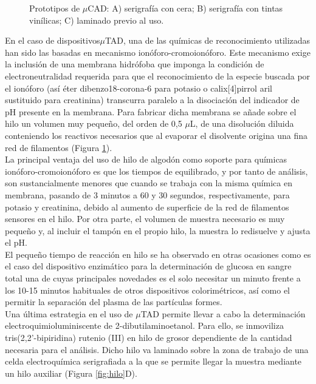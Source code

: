 \documentclass{article}
\begin{document}
\begin{figure}[h]
	\caption{Prototipos de $\mu$CAD: A) serigrafía con cera; B) serigrafía con tintas vinílicas; C) laminado previo al uso.}
	\label{fig:micro}
\end{figure}

En el caso de dispositivos$\mu$TAD, una de las químicas de reconocimiento utilizadas han sido las basadas en mecanismo ionóforo-cromoionóforo. Este mecanismo exige la inclusión de una membrana hidrófoba que imponga la condición de electroneutralidad requerida para que el reconocimiento de la especie buscada por el ionóforo (así éter dibenzo18-corona-6 para potasio\cite{Erenas2016} o calix[4]pirrol aril sustituido para creatinina) transcurra paralelo a la disociación del indicador de pH presente en la membrana. Para fabricar dicha membrana se añade sobre el hilo un volumen muy pequeño, del orden de 0,5 $\mu$L, de una disolución diluida conteniendo los reactivos necesarios que al evaporar el disolvente origina una fina red de filamentos (Figura \ref{fig:micro}).\\

La principal ventaja del uso de hilo de algodón como soporte para químicas ionóforo-cromoionóforo es que los tiempos de equilibrado, y por tanto de análisis, son sustancialmente menores que cuando se trabaja con la misma química en membrana, pasando de 3 minutos a 60 y 30 segundos, respectivamente, para potasio y creatinina, debido al aumento de superficie de la red de filamentos sensores en el hilo. Por otra parte, el volumen de muestra necesario es muy pequeño y, al incluir el tampón en el propio hilo, la muestra lo redisuelve y ajusta el pH. \\

El pequeño tiempo de reacción en hilo se ha observado en otras ocasiones como es el caso del dispositivo enzimático para la determinación de glucosa en sangre total una de cuyas principales novedades es el solo necesitar un minuto frente a los 10-15 minutos habituales de otros dispositivos colorimétricos, así como el permitir la separación del plasma de las partículas formes.\\

Una última estrategia en el uso de $\mu$TAD permite llevar a cabo la determinación electroquimioluminiscente de 2-dibutilaminoetanol. Para ello, se inmoviliza tris(2,2'-bipiridina) rutenio (III) en hilo de grosor dependiente de la cantidad necesaria para el análisis. Dicho hilo va laminado sobre la zona de trabajo de una celda electroquímica serigrafiada a la que se permite llegar la muestra mediante un hilo auxiliar (Figura \ref{fig:hilo}D).\\
\end{document}
